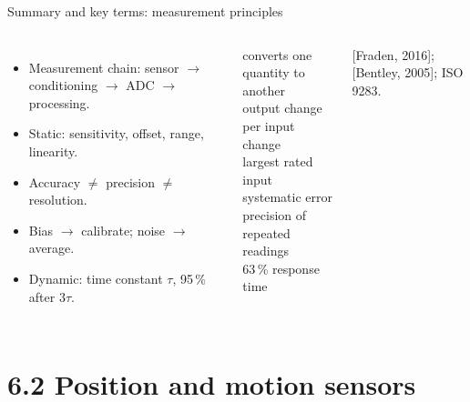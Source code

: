 \documentclass[aspectratio=169,10pt]{beamer}
\begin{document}
\begin{frame}{Summary and key terms: measurement principles}
\begin{columns}[T]
\begin{itemize}\small
\item Measurement chain: sensor $\rightarrow$ conditioning $\rightarrow$ ADC $\rightarrow$ processing.
\item Static: sensitivity, offset, range, linearity.
\item Accuracy $\neq$ precision $\neq$ resolution.
\item Bias $\rightarrow$ calibrate; noise $\rightarrow$ average.
\item Dynamic: time constant $\tau$, 95\,\% after $3\tau$.
\end{itemize}
\begin{defbox}
\small
{} converts one quantity to another\\
 output change per input change\\
 largest rated input\\
 systematic error\\
 precision of repeated readings\\
 63\,\% response time
\end{defbox}
{\scriptsize\color{mkGray} [Fraden, 2016]; [Bentley, 2005]; ISO 9283.}
\end{columns}
\end{frame}

\section{6.2 Position and motion sensors}
\end{document}
